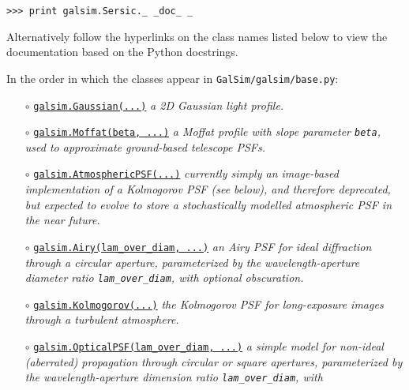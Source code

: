\documentclass[preprint,11pt]{aastex}
\begin{document}
{\tt >>> print galsim.Sersic.\_\,\_doc\_\,\_}

Alternatively follow the hyperlinks on
the class names listed below to view the documentation based
on the Python docstrings.

In the order in which
the classes appear in {\tt GalSim/galsim/base.py}:
\begin{itemize}
\item[$\circ$]
  \href{http://galsim-developers.github.com/GalSim/classgalsim_1_1base_1_1_gaussian.html}{\texttt{galsim.Gaussian(...)}}
  \newline \emph{a 2D Gaussian light profile.}
\item[$\circ$]
  \href{http://galsim-developers.github.com/GalSim/classgalsim_1_1base_1_1_moffat.html}{\texttt{galsim.Moffat(beta,
    ...)}}
  \newline \emph{a Moffat profile with slope parameter \texttt{beta}, used to approximate ground-based
    telescope PSFs.}
\item[$\circ$]
  \href{http://galsim-developers.github.com/GalSim/classgalsim_1_1base_1_1_atmospheric_p_s_f.html}{\texttt{galsim.AtmosphericPSF(...)}}
  \newline \emph{currently simply an image-based
  implementation of a Kolmogorov PSF (see below), and therefore deprecated, but expected to evolve to
  store a stochastically modelled atmospheric PSF in the near future.}
\item[$\circ$]
  \href{http://galsim-developers.github.com/GalSim/classgalsim_1_1base_1_1_airy.html}{\texttt{galsim.Airy(lam\_over\_diam,
      ...)}} \newline \emph{an Airy PSF for ideal diffraction
  through a circular aperture, parameterized by the wavelength-aperture
  diameter ratio \texttt{lam\_over\_diam}, with optional obscuration.}
\item[$\circ$] \href{http://galsim-developers.github.com/GalSim/classgalsim_1_1base_1_1_kolmogorov.html}{\texttt{galsim.Kolmogorov(...)}} \newline \emph{the Kolmogorov PSF for long-exposure
  images through a turbulent atmosphere.}
\item[$\circ$]
  \href{http://galsim-developers.github.com/GalSim/classgalsim_1_1base_1_1_optical_p_s_f.html}{\texttt{galsim.OpticalPSF(lam\_over\_diam,
      ...)}} \newline \emph{a simple model for non-ideal
  (aberrated) propagation through circular or square apertures, parameterized by the wavelength-aperture
  dimension ratio \texttt{lam\_over\_diam}, with
}
\end{itemize}
\end{document}
